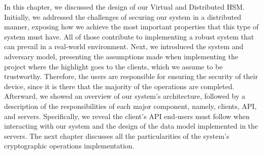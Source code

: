 In this chapter, we discussed the design of our Virtual and Distributed HSM. Initially, we addressed the challenges of securing our system in a distributed manner, exposing how we achieve the most important properties that this type of system must have. All of those contribute to implementing a robust system that can prevail in a real-world environment. Next, we introduced the system and adversary model, presenting the assumptions made when implementing the project where the highlight goes to the clients, which we assume to be trustworthy. Therefore, the users are responsible for ensuring the security of their device, since it is there that the majority of the operations are completed. Afterward, we showed an overview of our system's architecture, followed by a description of the responsibilities of each major component, namely, clients, API, and servers. Specifically, we reveal the client's API end-users must follow when interacting with our system and the design of the data model implemented in the servers.  The next chapter discusses all the particularities of the system's cryptographic operations implementation.


